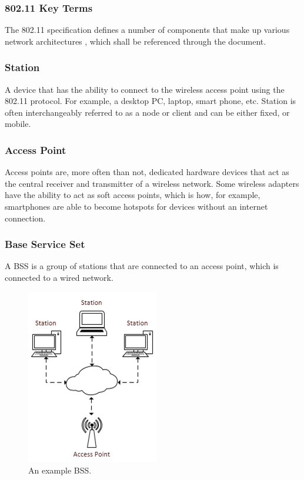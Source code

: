 \subsubsection{802.11 Key Terms}

The 802.11 specification defines a number of components that make up various network architectures \cite{intro:80211_lecture}, which shall be referenced through the document.

\subsubsection*{Station}
A device that has the ability to connect to the wireless access point using the 802.11 protocol. For example, a desktop PC, laptop, smart phone, etc. Station is often interchangeably referred to as a node or client and can be either fixed, or mobile.

\subsubsection*{Access Point}
Access points are, more often than not, dedicated hardware devices that act as the central receiver and transmitter of a wireless network. Some wireless adapters have the ability to act as soft access points, which is how, for example, smartphones are able to become hotspots for devices without an internet connection.

\subsubsection*{Base Service Set}
A BSS is a group of stations that are connected to an access point, which is connected to a wired network.

\begin{figure}[htb!]

\centering\includegraphics{intro/diagrams/bss.png}
\caption{An example BSS.}

\end{figure}


